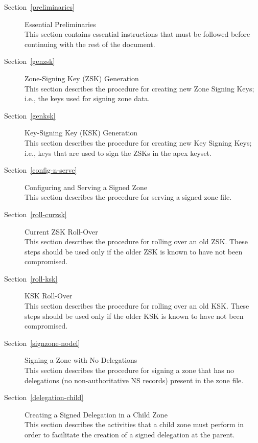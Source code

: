 \begin{description}

\item [Section~\ref{preliminaries}] {Essential Preliminaries}\\
This section contains essential instructions that must be followed before
continuing with the rest of the document.

\item [Section~\ref{genzsk}] {Zone-Signing Key (ZSK) Generation}\\
This section describes the procedure for creating new Zone Signing Keys; i.e.,
the keys used for signing zone data.

\item [Section~\ref{genksk}] {Key-Signing Key (KSK) Generation}\\
This section describes the procedure for creating new Key Signing Keys; i.e.,
keys that are used to sign the ZSKs in the apex keyset.

\item [Section~\ref{config-n-serve}] {Configuring and Serving a Signed Zone}\\
This section describes the procedure for serving a signed zone file.

\item [Section~\ref{roll-curzsk}] {Current ZSK Roll-Over}\\
This section describes the procedure for rolling over an old ZSK. These steps
should be used only if the older ZSK is known to have not been compromised.

\item [Section~\ref{roll-ksk}] {KSK Roll-Over}\\
This section describes the procedure for rolling over an old KSK. These steps
should be used only if the older KSK is known to have not been compromised.

\item [Section~\ref{signzone-nodel}] {Signing a Zone with No Delegations}\\
This section describes the procedure for signing a zone that has no
delegations (no non-authoritative NS records) present in the zone file.

\item [Section~\ref{delegation-child}] {Creating a Signed Delegation in a Child Zone}\\
This section describes the activities that a child zone must perform
in order to facilitate the creation of a signed delegation at the parent.


\end{description}
